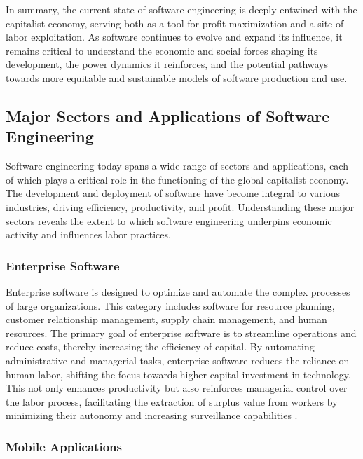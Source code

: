 \begin{refsection}
In summary, the current state of software engineering is deeply entwined with the capitalist economy, serving both as a tool for profit maximization and a site of labor exploitation. As software continues to evolve and expand its influence, it remains critical to understand the economic and social forces shaping its development, the power dynamics it reinforces, and the potential pathways towards more equitable and sustainable models of software production and use.

\subsection{Major Sectors and Applications of Software Engineering}

Software engineering today spans a wide range of sectors and applications, each of which plays a critical role in the functioning of the global capitalist economy. The development and deployment of software have become integral to various industries, driving efficiency, productivity, and profit. Understanding these major sectors reveals the extent to which software engineering underpins economic activity and influences labor practices.

\subsubsection{Enterprise Software}

Enterprise software is designed to optimize and automate the complex processes of large organizations. This category includes software for resource planning, customer relationship management, supply chain management, and human resources. The primary goal of enterprise software is to streamline operations and reduce costs, thereby increasing the efficiency of capital. By automating administrative and managerial tasks, enterprise software reduces the reliance on human labor, shifting the focus towards higher capital investment in technology. This not only enhances productivity but also reinforces managerial control over the labor process, facilitating the extraction of surplus value from workers by minimizing their autonomy and increasing surveillance capabilities \cite[pp.~35-38]{schwartz2001digital}.

\subsubsection{Mobile Applications}


\end{refsection}
